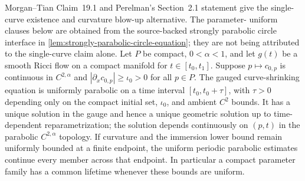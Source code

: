 \begin{theorem}
\label{thm:parametric-curve-shrinking-wellposedness}
\notready
Morgan--Tian Claim~19.1 and Perelman's Section~2.1 statement give the
single-curve existence and curvature blow-up alternative.  The parameter-
uniform clauses below are obtained from the source-backed strongly parabolic
circle interface in \ref{lem:strongly-parabolic-circle-equation}; they are not
being attributed to the single-curve claim alone.
Let $P$ be compact, $0<\alpha<1$, and let $g(t)$ be a smooth Ricci flow on a
compact manifold for $t\in[t_0,t_1]$.  Suppose $p\mapsto c_{0,p}$ is
continuous in $C^{2,\alpha}$ and $|\partial_xc_{0,p}|\ge\iota_0>0$ for all
$p\in P$.  The gauged curve-shrinking equation is uniformly parabolic on a
time interval $[t_0,t_0+\tau]$, with $\tau>0$ depending only on the compact
initial set, $\iota_0$, and ambient $C^2$ bounds.  It has a unique solution in
the gauge and hence a unique geometric solution up to time-dependent
reparametrization; the solution depends continuously on $(p,t)$ in the
parabolic $C^{2,\alpha}$ topology.  If curvature and the immersion lower
bound remain uniformly bounded at a finite endpoint, the uniform periodic
parabolic estimates continue every member across that endpoint.  In particular a
compact parameter family has a common lifetime whenever these bounds are
uniform.
\end{theorem}
